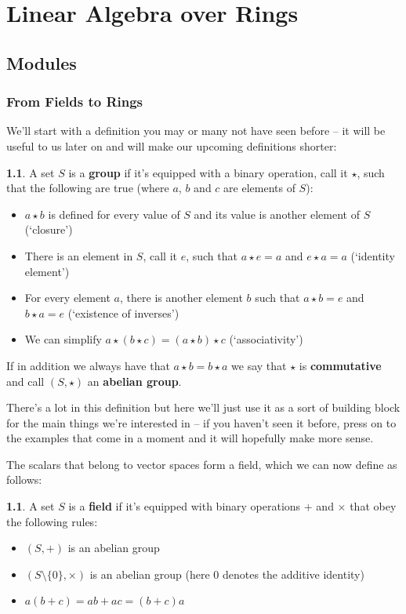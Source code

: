 \documentclass[oneside,english]{amsbook}
\numberwithin{section}{chapter}
\theoremstyle{plain}
\theoremstyle{definition}
\newtheorem{defn}[thm]{\protect\definitionname}
\providecommand{\definitionname}{Definition}
\begin{document}
	\part{Linear Algebra over Rings}
	
	\chapter{Modules}
		
		\section{From Fields to Rings}
				
			We'll start with a definition you may or many not have seen before -- it will be useful to us later on and will make our upcoming definitions shorter:
			
			\begin{defn}
				A set $S$ is a \textbf{group} if it's equipped with a binary operation, call it $\star$, such that the following are true (where $a$, $b$ and $c$ are elements of $S$):
				\begin{itemize}
					\item $a\star b$ is defined for every value of $S$ and its value is another element of $S$ (`closure')
					\item There is an element in $S$, call it $e$, such that $a\star e = a$ and $e\star a = a$ (`identity element')
					\item For every element $a$, there is another element $b$ such that $a\star b = e$ and $b\star a = e$ (`existence of inverses')
					\item We can simplify $a\star (b\star c) = (a\star b)\star c$ (`associativity')
				\end{itemize}
				If in addition we always have that $a\star b = b\star a$ we say that $\star$ is \textbf{commutative} and call $(S, \star)$ an \textbf{abelian group}.
			\end{defn}
			
			There's a lot in this definition but here we'll just use it as a sort of building block for the main things we're interested in -- if you haven't seen it before, press on to the examples that come in a moment and it will hopefully make more sense.
			
			The scalars that belong to vector spaces form a field, which we can now define as follows:
			
			\begin{defn}
				A set $S$ is a \textbf{field} if it's equipped with binary operations $+$ and $\times$ that obey the following rules:
				\begin{itemize}
					\item $(S, +)$ is an abelian group
					\item $(S\setminus\{0\}, \times)$ is an abelian group (here $0$ denotes the additive identity)
					\item $a(b + c) = ab + ac = (b + c)a$
				\end{itemize}
			\end{defn}
			
\end{document}
